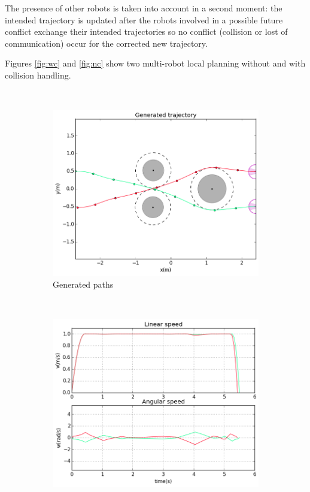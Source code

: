 The presence of other robots is taken into account in a second moment: the intended trajectory is updated after the robots involved in a possible future conflict exchange their intended trajectories so no conflict (collision or lost of communication) occur for the corrected new trajectory.

Figures \ref{fig:wc} and \ref{fig:nc} show two multi-robot local planning without and with collision handling.

\begin{figure}[!h]
        \centering
        ~ %
        \begin{subfigure}[b]{0.48\textwidth}
                \includegraphics[width=\textwidth]{./images/pwc.png}
                \caption{Generated paths}\label{fig:pwc}
        \end{subfigure}
        ~ %
        \begin{subfigure}[b]{0.48\textwidth}
                \includegraphics[width=\textwidth]{./images/vwc.png}

\end{subfigure}
\end{figure}
